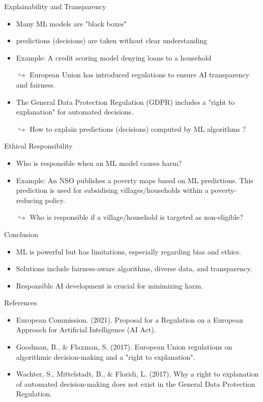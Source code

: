 \documentclass[xcolor=x11names,compress]{beamer}
\renewcommand{\(}{\begin{columns}}
\renewcommand{\)}{\end{columns}}
\newcommand{\<}[1]{\begin{column}{#1}}
\renewcommand{\>}{\end{column}}
\begin{document}
\begin{frame}{Explainability and Transparency}
    \begin{itemize}[<+->]
        \item Many ML models are "black boxes"
        \item predictions (decisions) are taken without clear understanding
        \item Example: A credit scoring model denying loans to a household
        \item[$\hookrightarrow$]  European Union has introduced regulations to ensure AI transparency and fairness.
        \item The General Data Protection Regulation (GDPR) includes a "right to explanation" for automated decisions.
         \item[$\hookrightarrow$] How to explain predictions (decisions) computed by ML algorithms ?
    \end{itemize}
\end{frame}


\begin{frame}{Ethical Responsibility}
    \begin{itemize}[<+->]
        \item Who is responsible when an ML model causes harm?
        \item Example: An NSO publishes a poverty maps based on ML predictions. This prediction is used for subsidising villages/households within a poverty-reducing policy.
        \item[$\hookrightarrow$] Who is responsible if a village/household is targeted as non-eligible?
    \end{itemize}
\end{frame}

\begin{frame}{Conclusion}
    \begin{itemize}[<+->]
        \item ML is powerful but has limitations, especially regarding bias and ethics.
        \item Solutions include fairness-aware algorithms, diverse data, and transparency.
        \item Responsible AI development is crucial for minimizing harm.
    \end{itemize}
\end{frame}


\begin{frame}{References}
    \begin{itemize}
        \item European Commission. (2021). Proposal for a Regulation on a European Approach for Artificial Intelligence (AI Act).
        \item Goodman, B., \& Flaxman, S. (2017). European Union regulations on algorithmic decision-making and a "right to explanation".
        \item Wachter, S., Mittelstadt, B., \& Floridi, L. (2017). Why a right to explanation of automated decision-making does not exist in the General Data Protection Regulation.
    \end{itemize}
\end{frame}
\end{document}
